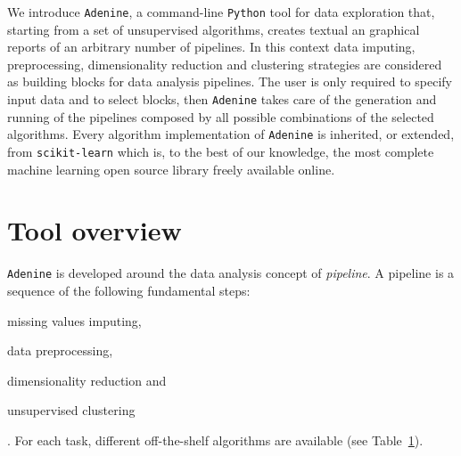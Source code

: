 \documentclass[twoside,11pt]{article}
\makeatletter
\newcommand{\ade}{\texttt{Adenine}\@\xspace}
\newcommand{\py}{\texttt{Python}\@\xspace}
\makeatother
\begin{document}
We introduce \ade, a command-line \py tool for data exploration that, starting from a set of unsupervised algorithms, creates textual an graphical reports of an arbitrary number of pipelines. In this context data imputing, preprocessing, dimensionality reduction and clustering strategies are considered as building blocks for data analysis pipelines. The user is only required to specify input data and to select blocks, then \ade takes care of the generation and running of the pipelines composed by all possible combinations of the selected algorithms. Every algorithm implementation of \ade is inherited, or extended, from \texttt{scikit-learn} \citep{scikit-learn} which is, to the best of our knowledge, the most complete machine learning open source library freely available online.


\section{Tool overview}\label{sec:implem}
\ade is developed around the data analysis concept of \emph{pipeline}. A pipeline is a sequence of the following fundamental steps:
\begin{enumerate*}[label=(\roman*)]
  \item missing values imputing,
  \item data preprocessing,
  \item dimensionality reduction and
  \item unsupervised clustering
\end{enumerate*}. 
For each task, different off-the-shelf algorithms are available (see Table~\ref{sec:implem}).%



\end{document}
